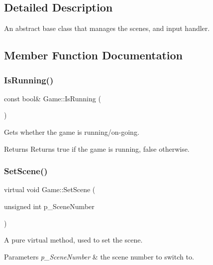 \subsection{Detailed Description}
An abstract base class that manages the scenes, and input handler. 

\subsection{Member Function Documentation}
\mbox{\label{class_game_a1fbd99129b2efca859afaaa7f45a62a4}} 
\subsubsection{\texorpdfstring{IsRunning()}{IsRunning()}}
{\footnotesize\ttfamily const bool\& Game\+::\+Is\+Running (\begin{DoxyParamCaption}{ }\end{DoxyParamCaption})\hspace{0.3cm}{\ttfamily [inline]}}



Gets whether the game is running/on-\/going. 

\begin{DoxyReturn}{Returns}
Returns true if the game is running, false otherwise. 
\end{DoxyReturn}
\mbox{\label{class_game_a22579e2500d8552e669ef9349480d960}} 
\subsubsection{\texorpdfstring{SetScene()}{SetScene()}}
{\footnotesize\ttfamily virtual void Game\+::\+Set\+Scene (\begin{DoxyParamCaption}\item[{unsigned int}]{p\+\_\+\+Scene\+Number }\end{DoxyParamCaption})\hspace{0.3cm}{\ttfamily [pure virtual]}}



A pure virtual method, used to set the scene. 


\begin{DoxyParams}{Parameters}
{\em p\+\_\+\+Scene\+Number} & the scene number to switch to. \\
\hline
\end{DoxyParams}


